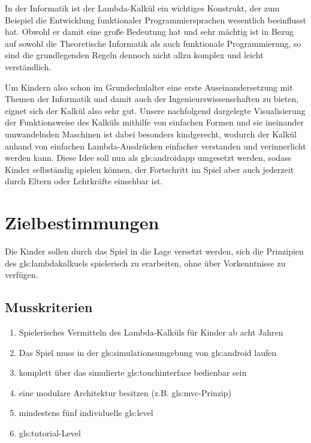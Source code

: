 \documentclass{scrartcl}
\begin{document}
In der Informatik ist der Lambda-Kalkül ein wichtiges Konstrukt, der
zum Beispiel die Entwicklung funktionaler Programmiersprachen wesentlich
beeinflusst hat. Obwohl er damit eine große Bedeutung hat und sehr
mächtig ist in Bezug auf sowohl die Theoretische Informatik als auch
funktionale Programmierung, so sind die grundlegenden Regeln dennoch
nicht allzu komplex und leicht verständlich. 

Um Kindern also schon im Grundschulalter eine erste Auseinandersetzung
mit Themen der Informatik und damit auch der Ingenieurswissenschaften
zu bieten, eignet sich der Kalkül also sehr gut. Unsere nachfolgend
dargelegte Visualisierung der Funktionsweise des Kalküls mithilfe
von einfachen Formen und sie ineinander umwandelnden Maschinen ist
dabei besonders kindgerecht, wodurch der Kalkül anhand von einfachen
Lambda-Ausdrücken einfacher verstanden und verinnerlicht werden kann.
Diese Idee soll nun als \gls{gls:androidapp} umgesetzt werden, sodass Kinder
selbständig spielen können, der Fortschritt im Spiel aber auch jederzeit
durch Eltern oder Lehrkräfte einsehbar ist. 

\clearpage









\section{Zielbestimmungen}


Die Kinder sollen durch das Spiel in die Lage versetzt werden, sich die Prinzipien des \gls{gls:lambdakalkuel}s spielerisch zu erarbeiten, ohne über Vorkenntnisse zu verfügen.

\subsection{Musskriterien}

\begin{enumerate}
	\item \label{muss:vermittelnlamba}Spielerisches Vermitteln des Lambda-Kalküls für Kinder ab acht Jahren
	\item \label{muss:simulationandroid}Das Spiel muss in der \gls{gls:simulationsumgebung} von \gls{gls:android} laufen
	\item \label{muss:touchinterface}komplett über das simulierte \gls{gls:touchinterface} bedienbar sein
	\item \label{muss:mvc}eine modulare Architektur besitzen (z.B. \gls{gls:mvc}-Prinzip)
	\item \label{muss:5indilevel}mindestens fünf individuelle \gls{gls:level}
	\item \label{muss:tutorial}\gls{gls:tutorial}-Level
\end{enumerate}
\end{document}
